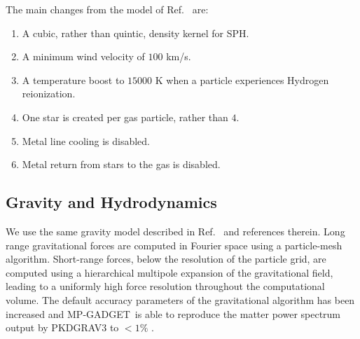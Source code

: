 \documentclass[a4paper,11pt]{article}
\newcommand{\mpgadget}{{\small MP-GADGET}}
\begin{document}
The main changes from the model of Ref.~\cite{Bird:2022} are:
\begin{enumerate}
\item A cubic, rather than quintic, density kernel for SPH.
\item A minimum wind velocity of $100$ km/s.
\item A temperature boost to $15000$ K when a particle experiences Hydrogen reionization.
\item One star is created per gas particle, rather than $4$.
\item Metal line cooling is disabled.
\item Metal return from stars to the gas is disabled.
\end{enumerate}


\subsection{Gravity and Hydrodynamics}

We use the same gravity model described in Ref.~\cite{Bird:2022} and references therein. Long range gravitational forces are computed in Fourier space using a particle-mesh algorithm. Short-range forces, below the resolution of the particle grid, are computed using a hierarchical multipole expansion of the gravitational field, leading to a uniformly high force resolution throughout the computational volume. The default accuracy parameters of the gravitational algorithm has been increased and \mpgadget~is able to reproduce the matter power spectrum output by PKDGRAV3 to $<1\%$ \cite{Schneider:2016}.
\end{document}
